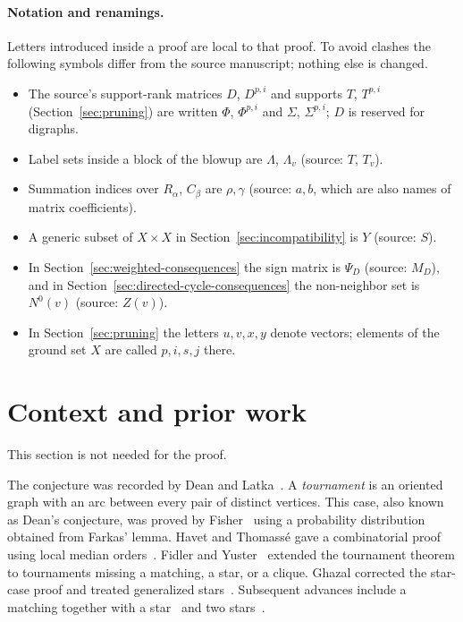 \documentclass[11pt]{article}
\theoremstyle{remark}
\begin{document}
\paragraph{Notation and renamings.}
Letters introduced inside a proof are local to that proof. To avoid clashes
the following symbols differ from the source manuscript; nothing else is
changed.
\begin{itemize}[leftmargin=2em,itemsep=1pt]
\item The source's support-rank matrices $D$, $D^{p,i}$ and supports $T$,
$T^{p,i}$ (Section~\ref{sec:pruning}) are written $\Phi$, $\Phi^{p,i}$ and
$\Sigma$, $\Sigma^{p,i}$; $D$ is reserved for digraphs.
\item Label sets inside a block of the blowup are $\Lambda$, $\Lambda_v$
(source: $T$, $T_v$).
\item Summation indices over $R_\alpha$, $C_\beta$ are $\rho,\gamma$ (source:
$a,b$, which are also names of matrix coefficients).
\item A generic subset of $X\times X$ in Section~\ref{sec:incompatibility} is
$Y$ (source: $S$).
\item In Section~\ref{sec:weighted-consequences} the sign matrix is $\Psi_D$
(source: $M_D$), and in Section~\ref{sec:directed-cycle-consequences} the
non-neighbor set is $N^0(v)$ (source: $Z(v)$).
\item In Section~\ref{sec:pruning} the letters $u,v,x,y$ denote vectors;
elements of the ground set $X$ are called $p,i,s,j$ there.
\end{itemize}

\section{Context and prior work}\label{sec:context}

This section is not needed for the proof.

The conjecture was recorded by Dean and Latka~\cite{DeanLatka1995}.
A \emph{tournament} is an oriented graph with an arc between every pair of
distinct vertices. This case, also known as Dean's conjecture, was proved
by Fisher~\cite{Fisher1996} using a probability distribution obtained from
Farkas' lemma. Havet and Thomass\'e gave a combinatorial proof using
local median orders~\cite{HavetThomasse2000}. Fidler and
Yuster~\cite{FidlerYuster2007} extended the tournament theorem to
tournaments missing a matching, a star, or a clique. Ghazal corrected the
star-case proof and treated generalized stars~\cite{Ghazal2012}.
Subsequent advances include a matching together with a
star~\cite{DaraFrancisJacobNarayanan2022} and two
stars~\cite{DaamouchAlMninyGhazal2025}.
\end{document}
